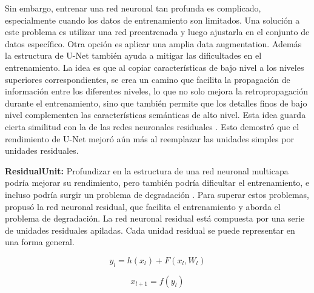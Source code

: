 	Sin embargo, entrenar una red neuronal tan profunda es complicado, especialmente cuando los datos de entrenamiento son limitados. Una solución a este problema es utilizar una red preentrenada y luego ajustarla en el conjunto de datos específico. Otra opción es aplicar una amplia data augmentation. Además la estructura de U-Net también ayuda a mitigar las dificultades en el entrenamiento. La idea es que al copiar características de bajo nivel a los niveles superiores correspondientes, se crea un camino que facilita la propagación de información entre los diferentes niveles, lo que no solo mejora la retropropagación durante el entrenamiento, sino que también permite que los detalles finos de bajo nivel complementen las características semánticas de alto nivel. Esta idea guarda cierta similitud con la de las redes neuronales residuales \parencite{he2016deep}. Esto demostró que el rendimiento de U-Net mejoró aún más al reemplazar las unidades simples por unidades residuales.
	
	\textbf{ResidualUnit:} Profundizar en la estructura de una red neuronal multicapa podría mejorar su rendimiento, pero también podría dificultar el entrenamiento, e incluso podría surgir un problema de degradación \parencite{he2016deep}. Para superar estos problemas, \parencite{he2016deep} propusó la red neuronal residual, que facilita el entrenamiento y aborda el problema de degradación. La red neuronal residual está compuesta por una serie de unidades residuales apiladas. Cada unidad residual se puede representar en una forma general.
	
	\begin{equation}
		\label{eq:residual}
		y_l = h(x_l) + F(x_l, W_l)
	\end{equation}
	
	\begin{equation}
		\label{eq:residual2}
		x_{l+1} = f(y_l)
	\end{equation}

